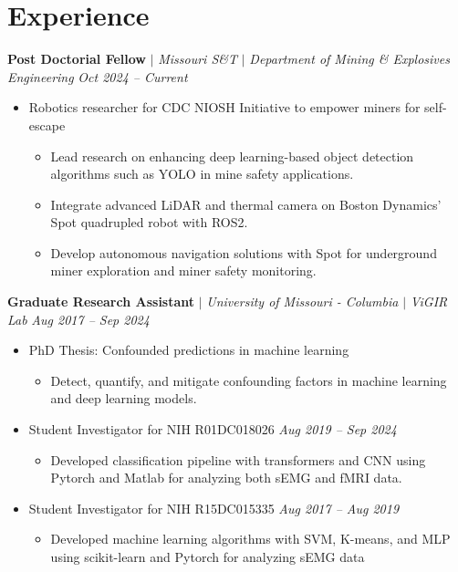 \documentclass[letterpaper,10pt]{article}
\begin{document}
\section{Experience}

\textbf{Post Doctorial Fellow} $|$
\emph{Missouri S\&T} $|$
\emph{Department of Mining \& Explosives Engineering} \hfill
\emph{Oct 2024 -- Current}
\begin{itemize}[leftmargin=0.15in, parsep=0pt] 
\item Robotics researcher for CDC NIOSH Initiative to empower miners for self-escape
  \begin{itemize}[leftmargin=0.15in, parsep=0pt] 
    \item Lead research on enhancing deep learning-based object detection algorithms such as YOLO in mine safety applications.
    \item Integrate advanced LiDAR and thermal camera on Boston Dynamics' Spot quadrupled robot with ROS2.
    \item Develop autonomous navigation solutions with Spot for underground miner exploration and miner safety monitoring.
  \end{itemize}
\end{itemize}

\textbf{Graduate Research Assistant} $|$
\emph{University of Missouri - Columbia} $|$
\emph{ViGIR Lab} \hfill
\emph{Aug 2017 -- Sep 2024}
\begin{itemize}[leftmargin=0.15in, parsep=0pt] 
  \item PhD Thesis: Confounded predictions in machine learning
  \begin{itemize}[leftmargin=0.15in, parsep=0pt] 
    \item Detect, quantify, and mitigate confounding factors in machine learning and deep learning models.
  \end{itemize}
  \item Student Investigator for NIH R01DC018026 \hfill
  \emph{Aug 2019 -- Sep 2024}
  \begin{itemize}[leftmargin=0.15in, parsep=0pt]
    \item Developed classification pipeline with transformers and CNN using Pytorch and Matlab for analyzing both sEMG and fMRI data. 
  \end{itemize}
  \item Student Investigator for NIH R15DC015335 \hfill
  \emph{Aug 2017 -- Aug 2019}
  \begin{itemize}[leftmargin=0.15in, parsep=0pt]
    \item Developed machine learning algorithms with SVM, K-means, and MLP using scikit-learn and Pytorch for analyzing sEMG data
  \end{itemize}
\end{itemize}
\end{document}
